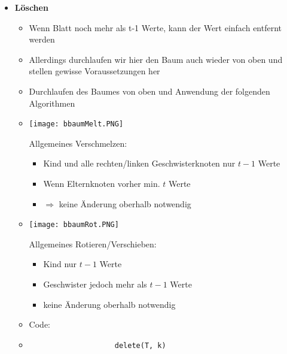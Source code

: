\begin{itemize}
        \item \textbf{Löschen}
            \begin{itemize}
                \item Wenn Blatt noch mehr als t-1 Werte, kann der Wert einfach entfernt werden
                \item Allerdings durchlaufen wir hier den Baum auch wieder von oben und stellen gewisse Voraussetzungen her
                \item Durchlaufen des Baumes von oben und Anwendung der folgenden Algorithmen
                \item[]
                    \begin{minipage}{0.25\textwidth}
                        \texttt{[image: bbaumMelt.PNG]}
                    \end{minipage}
                    \begin{minipage}{0.65\textwidth}
                        Allgemeines Verschmelzen:
                        \begin{itemize}
                            \item Kind und alle rechten/linken Geschwisterknoten nur $t-1$ Werte
                            \item Wenn Elternknoten vorher min. $t$ Werte
                            \item[] $\Rightarrow$ keine Änderung oberhalb notwendig
                        \end{itemize}
                    \end{minipage}
                \item[]
                    \begin{minipage}{0.25\textwidth}
                        \texttt{[image: bbaumRot.PNG]}
                    \end{minipage}
                    \begin{minipage}{0.65\textwidth}
                        Allgemeines Rotieren/Verschieben:
                        \begin{itemize}
                            \item Kind nur $t-1$ Werte
                            \item Geschwister jedoch mehr als $t-1$ Werte
                            \item keine Änderung oberhalb notwendig
                        \end{itemize}
                    \end{minipage}
                \item Code:
                \item[]
                    \begin{verbatim}
                    delete(T, k)
                    

\end{verbatim}
\end{itemize}
\end{itemize}

